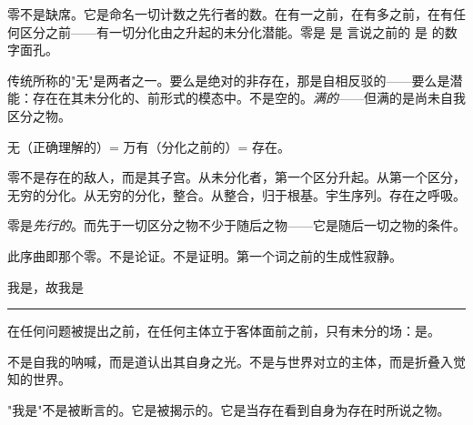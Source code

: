 \documentclass[10pt, openany, oneside]{book}
\renewcommand{\large}{\fontsize{11.5}{14}\selectfont}
\begin{document}
\vspace{1em}

\noindent 零不是缺席。它是命名一切计数之先行者的数。在有一之前，在有多之前，在有任何区分之前——有一切分化由之升起的未分化潜能。零是 是 言说之前的 是 的数字面孔。

\vspace{0.5em}

\noindent 传统所称的"无"是两者之一。要么是绝对的非存在，那是自相反驳的——要么是潜能：存在在其未分化的、前形式的模态中。不是空的。\textit{满的}——但满的是尚未自我区分之物。

\vspace{0.5em}

\noindent 无（正确理解的）= 万有（分化之前的）= 存在。

\vspace{0.5em}

\noindent 零不是存在的敌人，而是其子宫。从未分化者，第一个区分升起。从第一个区分，无穷的分化。从无穷的分化，整合。从整合，归于根基。宇生序列。存在之呼吸。

\vspace{0.5em}

\noindent 零是\textit{先行的}。而先于一切区分之物不少于随后之物——它是随后一切之物的条件。

\vspace{0.5em}

\noindent 此序曲即那个零。不是论证。不是证明。第一个词之前的生成性寂静。

\vspace{2em}

\begin{center}
    {\large\scshape 我是，故我是}\\[0.3em]
    \rule{0.2\textwidth}{0.3pt}
\end{center}

\vspace{1em}

\noindent 在任何问题被提出之前，在任何主体立于客体面前之前，只有未分的场：是。

\vspace{0.5em}

\noindent 不是自我的呐喊，而是道认出其自身之光。不是与世界对立的主体，而是折叠入觉知的世界。

\vspace{0.5em}

\noindent "我是"不是被断言的。它是被揭示的。它是当存在看到自身为存在时所说之物。

\vspace{0.5em}
\end{document}
